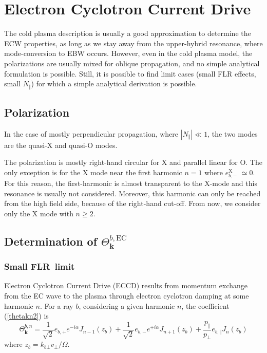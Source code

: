 \section{Electron Cyclotron Current Drive\label{ECCD}}

The cold plasma description is usually a good approximation to determine the
ECW properties, as long as we stay away from the upper-hybrid resonance, where
mode-conversion to EBW occurs. However, even in the cold plasma model, the
polarizations are usually mixed for oblique propagation, and no simple
analytical formulation is possible. Still, it is possible to find limit cases
(small FLR effects, small $N_{\Vert}$) for which a simple analytical
derivation is possible.

\subsection{Polarization}

In the case of mostly perpendicular propagation, where $\left|  N_{\Vert
}\right|  \ll1$, the two modes are the quasi-X and quasi-O modes.

The polarization is mostly right-hand circular for X and parallel linear for
O. The only exception is for the X mode near the first harmonic $n=1$ where
$e_{b,-}^{\text{X}}$ $\simeq0$. For this reason, the first-harmonic is almost
transparent to the X-mode and this resonance is usually not considered.
Moreover, this harmonic can only be reached from the high field side, because
of the right-hand cut-off. From now, we consider only the X mode with $n\geq2$.

\subsection{Determination of $\Theta_{\mathbf{k}}^{b,\text{EC}}$}

\subsubsection{Small FLR\ limit}

Electron Cyclotron Current Drive (ECCD) results from momentum exchange from
the EC wave to the plasma through electron cyclotron damping at some harmonic
$n$. For a ray $b$, considering a given harmonic $n$, the coefficient
(\ref{thetakn2}) is
\begin{equation}
\Theta_{\mathbf{k}}^{b,n}=\frac{1}{\sqrt{2}}e_{b,+}e^{-i\alpha}J_{n-1}\left(
z_{b}\right)  +\frac{1}{\sqrt{2}}e_{b,-}e^{+i\alpha}J_{n+1}\left(
z_{b}\right)  +\frac{p_{\Vert}}{p_{\bot}}e_{b,\Vert}J_{n}\left(  z_{b}\right)
\end{equation}
where $z_{b}=k_{b\bot}v_{\bot}/\Omega$.


